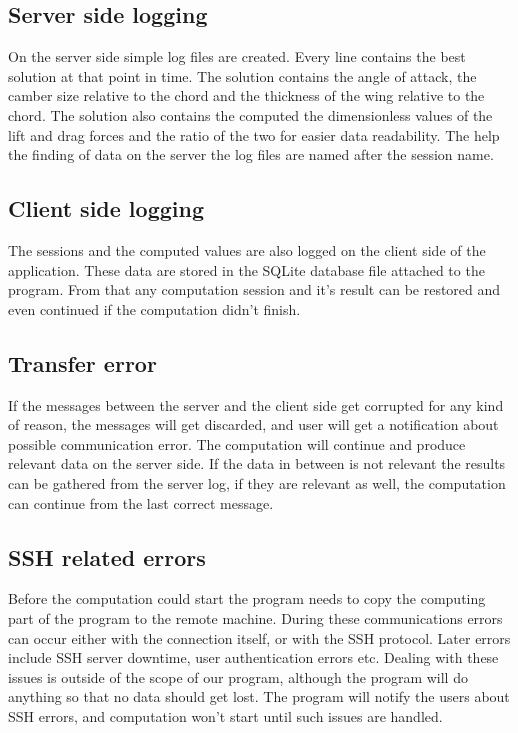 \documentclass[10pt,a4paper]{report}
\begin{document}
\subsection{Server side logging}
On the server side simple log files are created. Every line contains the best solution at that point in time. The solution contains the angle of attack, the camber size relative to the chord and the thickness of the wing relative to the chord. The solution also contains the computed the dimensionless values of the lift and drag forces and the ratio of the two for easier data readability. The help the finding of data on the server the log files are named after the session name.

\subsection{Client side logging}
The sessions and the computed values are also logged on the client side of the application. These data are stored in the SQLite database file attached to the program. From that any computation session and it's result can be restored and even continued if the computation didn't finish.

\subsection{Transfer error}
If the messages between the server and the client side get corrupted for any kind of reason, the messages will get discarded, and user will get a notification about possible communication error. The computation will continue and produce relevant data on the server side. If the data in between is not relevant the results can be gathered from the server log, if they are relevant as well, the computation can continue from the last correct message.

\subsection{SSH related errors}
Before the computation could start the program needs to copy the computing part of the program to the remote machine. During these communications errors can occur either with the connection itself, or with the SSH protocol. Later errors include SSH server downtime, user authentication errors etc. Dealing with these issues is outside of the scope of our program, although the program will do anything so that no data should get lost. The program will notify the users about SSH errors, and computation won't start until such issues are handled.
\end{document}
